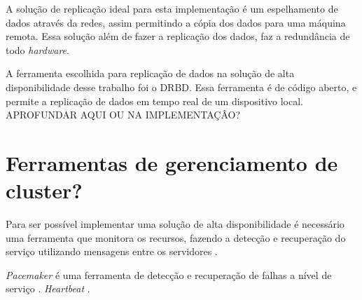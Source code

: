A solução de replicação ideal para esta implementação é um espelhamento de dados através da redes, assim permitindo a cópia dos dados para uma
máquina remota. Essa solução além de fazer a replicação dos dados, faz a redundância de todo \textit{hardware}.

A ferramenta escolhida para replicação de dados na solução de alta disponibilidade desse trabalho foi o \ac{DRBD}. Essa ferramenta é de código
aberto, e permite a replicação de dados em tempo real de um dispositivo local. 
APROFUNDAR AQUI OU NA IMPLEMENTAÇÂO?


\section{Ferramentas de gerenciamento de cluster?}
\label{section:toolcluster}

Para ser possível implementar uma solução de alta disponibilidade é necessário uma ferramenta que monitora os recursos, fazendo a detecção e
recuperação do serviço utilizando mensagens entre os servidores \cite{perkov2011}.

\textit{Pacemaker} é uma ferramenta de detecção e recuperação de falhas a nível de serviço \cite{perkov2011}. 
\textit{Heartbeat} \cite{zaminhani2008}.


